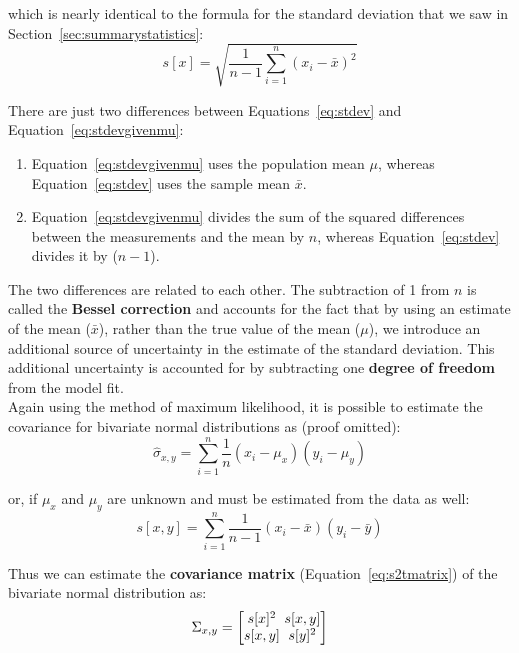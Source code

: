 \begin{refsection}
\noindent which is nearly identical to the formula for the standard
deviation that we saw in Section~\ref{sec:summarystatistics}:
\begin{equation}
  s[x] = \sqrt{\frac{1}{n-1}\sum\limits_{i=1}^{n}(x_i-\bar{x})^2}
  \label{eq:stdev}
\end{equation}

There are just two differences between
Equations~\ref{eq:stdev} and
Equation~\ref{eq:stdevgivenmu}:
\begin{enumerate}
\item Equation~\ref{eq:stdevgivenmu} uses the population mean $\mu$,
  whereas Equation~\ref{eq:stdev} uses the sample mean $\bar{x}$.
\item Equation~\ref{eq:stdevgivenmu} divides the sum of the squared
  differences between the measurements and the mean by $n$, whereas
  Equation~\ref{eq:stdev} divides it by ($n-1$).
\end{enumerate}

The two differences are related to each other. The subtraction of 1
from $n$ is called the \textbf{Bessel correction} and accounts for the
fact that by using an estimate of the mean ($\bar{x}$), rather than
the true value of the mean ($\mu$), we introduce an additional source
of uncertainty in the estimate of the standard deviation. This
additional uncertainty is accounted for by subtracting one
\textbf{degree of freedom} from the model fit.\\

Again using the method of maximum likelihood, it is possible to
estimate the covariance for bivariate normal distributions as (proof
omitted):
\begin{equation}
  \hat{\sigma}_{x,y} = \sum\limits_{i=1}^{n}\frac{1}{n}(x_i-\mu_x)(y_i-\mu_y)
\end{equation}

\noindent or, if $\mu_x$ and $\mu_y$ are unknown and must be estimated
from the data as well:
\begin{equation}
  s[x,y] = \sum\limits_{i=1}^{n}\frac{1}{n-1}(x_i-\bar{x})(y_i-\bar{y})
  \label{eq:sxy}
\end{equation}

Thus we can estimate the \textbf{covariance matrix}
(Equation~\ref{eq:s2tmatrix}) of the bivariate normal distribution as:
\begin{equation}
  \Sigma_{x,y} =
  \left[
    \begin{array}{@{}c@{~}c@{}}
      s[x]^2 & s[x,y]\\
      s[x,y] & s[y]^2
    \end{array}
    \right]
\end{equation}


\end{refsection}
